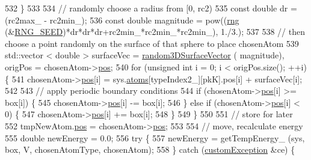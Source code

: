 \begin{DoxyCode}
532                     \}
533 
534                     \textcolor{comment}{// randomly choose a radius from [0, rc2)}
535                     \textcolor{keyword}{const} \textcolor{keywordtype}{double} dr = (rc2max\_ - rc2min\_);
536                 \textcolor{keyword}{const} \textcolor{keywordtype}{double} magnitude = pow((\hyperlink{utilities_8cpp_a0f9542af4b475ac79cb679d7a8d14db0}{rng} (&\hyperlink{global_8h_a3f4e4ea24d5a5c66feae55d1f329c884}{RNG\_SEED})*dr*dr*dr+rc2min\_*rc2min\_*rc2min\_),
       1./3.);
537 
538                     \textcolor{comment}{// then choose a point randomly on the surface of that sphere to place chosenAtom}
539                     std::vector < double > surfaceVec = \hyperlink{utilities_8cpp_af1bc480936b7436d4e679abc5a837815}{random3DSurfaceVector} (
      magnitude), origPos = chosenAtom->\hyperlink{classatom_a3ae5f4880e7831d8b2c9fda72b4eb24a}{pos};
540                     \textcolor{keywordflow}{for} (\textcolor{keywordtype}{unsigned} \textcolor{keywordtype}{int} i = 0; i < origPos.size(); ++i) \{
541                         chosenAtom->\hyperlink{classatom_a3ae5f4880e7831d8b2c9fda72b4eb24a}{pos}[i] = sys.\hyperlink{classsim_system_a90421b19082f7fb8fc23b7264b1161e4}{atoms}[typeIndex2\_][pkK].pos[i] + surfaceVec[i];
542 
543                         \textcolor{comment}{// apply periodic boundary conditions}
544                         \textcolor{keywordflow}{if} (chosenAtom->\hyperlink{classatom_a3ae5f4880e7831d8b2c9fda72b4eb24a}{pos}[i] >= box[i]) \{
545                                 chosenAtom->\hyperlink{classatom_a3ae5f4880e7831d8b2c9fda72b4eb24a}{pos}[i] -= box[i];
546                         \} \textcolor{keywordflow}{else} \textcolor{keywordflow}{if} (chosenAtom->\hyperlink{classatom_a3ae5f4880e7831d8b2c9fda72b4eb24a}{pos}[i] < 0) \{
547                                 chosenAtom->\hyperlink{classatom_a3ae5f4880e7831d8b2c9fda72b4eb24a}{pos}[i] += box[i];
548                         \}
549                     \}
550 
551                     \textcolor{comment}{// store for later}
552                     tmpNewAtom.\hyperlink{classatom_a3ae5f4880e7831d8b2c9fda72b4eb24a}{pos} = chosenAtom->\hyperlink{classatom_a3ae5f4880e7831d8b2c9fda72b4eb24a}{pos};
553 
554                     \textcolor{comment}{// move, recalculate energy}
555                     \textcolor{keywordtype}{double} newEnergy = 0.0;
556                     \textcolor{keywordflow}{try} \{
557                         newEnergy = getTempEnergy\_ (sys, box, V, chosenAtomType, chosenAtom);
558                     \} \textcolor{keywordflow}{catch} (\hyperlink{classcustom_exception}{customException} &ce) \{

\end{DoxyCode}
